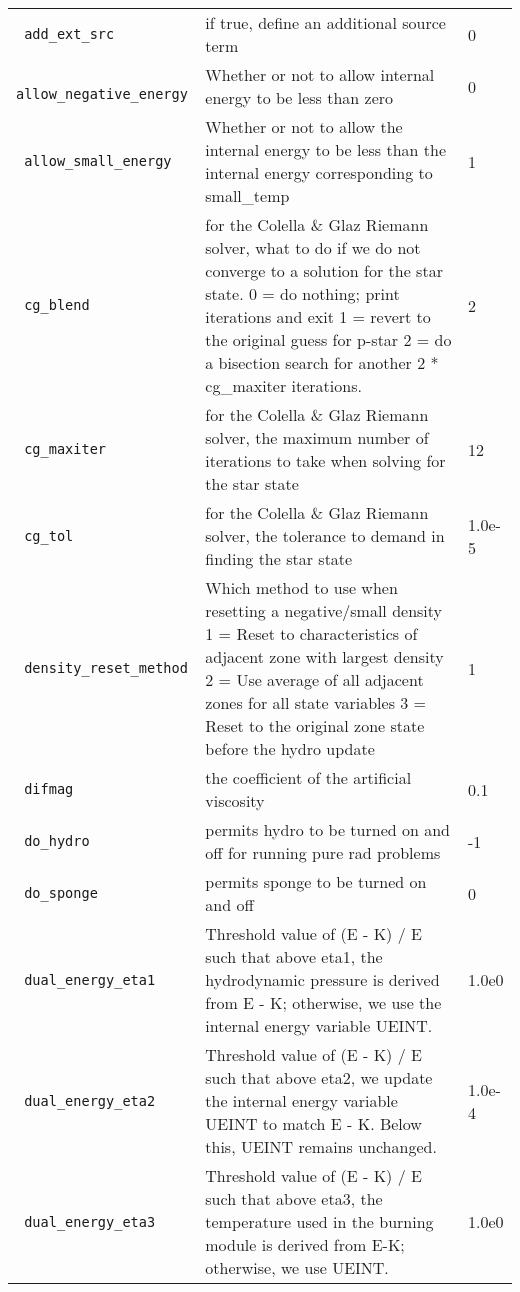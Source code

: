 \begin{landscape}
{\begin{center}
\begin{longtable}{|l|p{5.25in}|l|}
\rowcolor{tableShade}
\verb= add_ext_src = &  if true, define an additional source term & 0 \\
\verb= allow_negative_energy = &  Whether or not to allow internal energy to be less than zero & 0 \\
\rowcolor{tableShade}
\verb= allow_small_energy = &  Whether or not to allow the internal energy to be less than the internal energy corresponding to small\_temp & 1 \\
\verb= cg_blend = &  for the Colella \& Glaz Riemann solver, what to do if we do not converge to a solution for the star state. 0 = do nothing; print iterations and exit 1 = revert to the original guess for p-star 2 = do a bisection search for another 2 * cg\_maxiter iterations. & 2 \\
\rowcolor{tableShade}
\verb= cg_maxiter = &  for the Colella \& Glaz Riemann solver, the maximum number of iterations to take when solving for the star state & 12 \\
\verb= cg_tol = &  for the Colella \& Glaz Riemann solver, the tolerance to demand in finding the star state & 1.0e-5 \\
\rowcolor{tableShade}
\verb= density_reset_method = &  Which method to use when resetting a negative/small density 1 = Reset to characteristics of adjacent zone with largest density 2 = Use average of all adjacent zones for all state variables 3 = Reset to the original zone state before the hydro update & 1 \\
\verb= difmag = &  the coefficient of the artificial viscosity & 0.1 \\
\rowcolor{tableShade}
\verb= do_hydro = &  permits hydro to be turned on and off for running pure rad problems & -1 \\
\verb= do_sponge = &  permits sponge to be turned on and off & 0 \\
\rowcolor{tableShade}
\verb= dual_energy_eta1 = &  Threshold value of (E - K) / E such that above eta1, the hydrodynamic pressure is derived from E - K; otherwise, we use the internal energy variable UEINT. & 1.0e0 \\
\verb= dual_energy_eta2 = &  Threshold value of (E - K) / E such that above eta2, we update the internal energy variable UEINT to match E - K. Below this, UEINT remains unchanged. & 1.0e-4 \\
\rowcolor{tableShade}
\verb= dual_energy_eta3 = &  Threshold value of (E - K) / E such that above eta3, the temperature used in the burning module is derived from E-K; otherwise, we use UEINT. & 1.0e0 \\

\end{longtable}
\end{center}}
\end{landscape}
